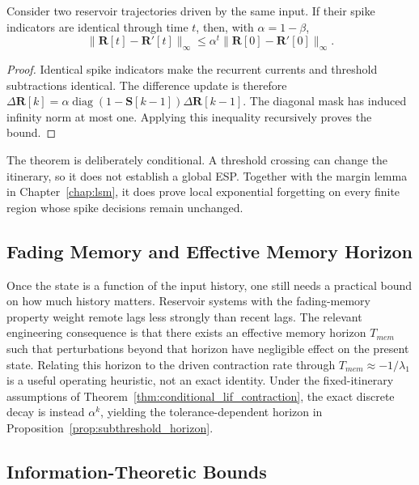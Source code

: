 \begin{theorem}
\label{thm:conditional_lif_contraction}
Consider two reservoir trajectories driven by the same input. If their spike
indicators are identical through time $t$, then, with $\alpha=1-\beta$,
\begin{equation}
\|\mathbf{R}[t]-\mathbf{R}'[t]\|_\infty
\le\alpha^t\|\mathbf{R}[0]-\mathbf{R}'[0]\|_\infty.
\end{equation}
\end{theorem}

\begin{proof}
Identical spike indicators make the recurrent currents and threshold
subtractions identical. The difference update is therefore
$\Delta\mathbf{R}[k]=\alpha\operatorname{diag}(1-\mathbf{S}[k-1])
\Delta\mathbf{R}[k-1]$. The diagonal mask has induced infinity norm at most one.
Applying this inequality recursively proves the bound.
\end{proof}

The theorem is deliberately conditional. A threshold crossing can change the
itinerary, so it does not establish a global ESP. Together with the margin lemma
in Chapter~\ref{chap:lsm}, it does prove local exponential forgetting on every
finite region whose spike decisions remain unchanged.

\subsection{Fading Memory and Effective Memory Horizon}

Once the state is a function of the input history, one still needs a practical bound on how much history matters. Reservoir systems with the fading-memory property weight remote lags less strongly than recent lags. The relevant engineering consequence is that there exists an effective memory horizon $T_{mem}$ such that perturbations beyond that horizon have negligible effect on the present state. Relating this horizon to the driven contraction rate through $T_{mem}\approx -1/\lambda_1$ is a useful operating heuristic, not an exact identity. Under the fixed-itinerary assumptions of Theorem~\ref{thm:conditional_lif_contraction}, the exact discrete decay is instead $\alpha^k$, yielding the tolerance-dependent horizon in Proposition~\ref{prop:subthreshold_horizon}.

\subsection{Information-Theoretic Bounds}

